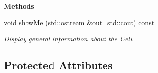 \begin{Indent}{\bf Methods}\par
\begin{DoxyCompactItemize}
\item 
void \hyperlink{classFVCode3D_1_1Rigid__Mesh_1_1Cell_a0f485e24d514792089e16dd8855e9247}{show\+Me} (std\+::ostream \&out=std\+::cout) const 
\begin{DoxyCompactList}\small\item\em Display general information about the \hyperlink{classFVCode3D_1_1Rigid__Mesh_1_1Cell}{Cell}. \end{DoxyCompactList}\end{DoxyCompactItemize}
\end{Indent}
\subsection*{Protected Attributes}
